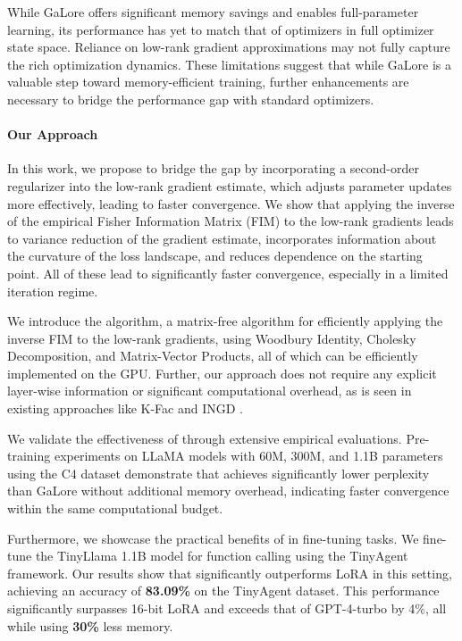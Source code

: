 While GaLore offers significant memory savings and enables full-parameter learning, its performance has yet to match that of optimizers in full optimizer state space. Reliance on low-rank gradient approximations may not fully capture the rich optimization dynamics. These limitations suggest that while GaLore is a valuable step toward memory-efficient training, further enhancements are necessary to bridge the performance gap with standard optimizers.

\paragraph{Our Approach}

In this work, we propose to bridge the gap by incorporating a second-order regularizer into the low-rank gradient estimate, which adjusts parameter updates more effectively, leading to faster convergence. We show that applying the inverse of the empirical Fisher Information Matrix (FIM) to the low-rank gradients leads to variance reduction of the gradient estimate, incorporates information about the curvature of the loss landscape, and reduces dependence on the starting point. All of these lead to significantly faster convergence, especially in a limited iteration regime.

We introduce the \textit{\lowrank} algorithm, a matrix-free algorithm for efficiently applying the inverse FIM to the low-rank gradients, using Woodbury Identity, Cholesky Decomposition, and Matrix-Vector Products, all of which can be efficiently implemented on the GPU. Further, our approach does not require any explicit layer-wise information or significant computational overhead, as is seen in existing approaches like K-Fac \citep{martens2015optimizing} and INGD \citep{luise2019implicit}.

 We validate the effectiveness of \textit{\lowrank} through extensive empirical evaluations. Pre-training experiments on LLaMA models with 60M, 300M, and 1.1B parameters using the C4 dataset demonstrate that \textit{\lowrank} achieves significantly lower perplexity than GaLore without additional memory overhead, indicating faster convergence within the same computational budget.

 Furthermore, we showcase the practical benefits of \textit{\lowrank} in fine-tuning tasks. We fine-tune the TinyLlama 1.1B model for function calling using the TinyAgent framework. Our results show that \textit{\lowrank} significantly outperforms LoRA in this setting, achieving an accuracy of \textbf{83.09\%} on the TinyAgent dataset. This performance significantly surpasses 16-bit LoRA and exceeds that of GPT-4-turbo by 4\%, all while using \textbf{30\%} less memory.




